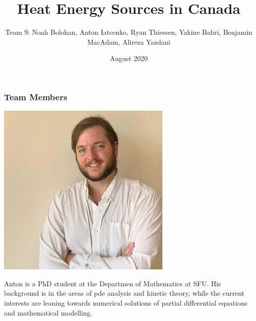 \documentclass{beamer}
\title{Heat Energy Sources in Canada}
\author[Team 9]{Team 9: Noah Bolohan, Anton Iatcenko, Ryan Thiessen, Yakine Bahri, Benjamin MacAdam, Alireza Yazdani}
\institute[]{Math\textsuperscript{Industry}}
\date{August 2020}
\begin{document}
\frame{\titlepage}


\begin{frame}
\frametitle{Team Members}

\begin{minipage}[b]{0.15\textwidth}
\includegraphics[width=\textwidth, trim={70pt 170pt 70pt 100pt}, clip]{TeamPics/Ben.jpg}
\end{minipage}\hspace{0.05\textwidth}%
\begin{minipage}[b]{0.8\textwidth}
{\small Anton is a PhD student at the Departmen of Mathematics at SFU. His background is in the areas of pde analysis and kinetic theory, while the current interests are leaning towards numerical solutions of partial differential equations and mathematical modelling. }
\end{minipage}


\end{frame}
\end{document}
